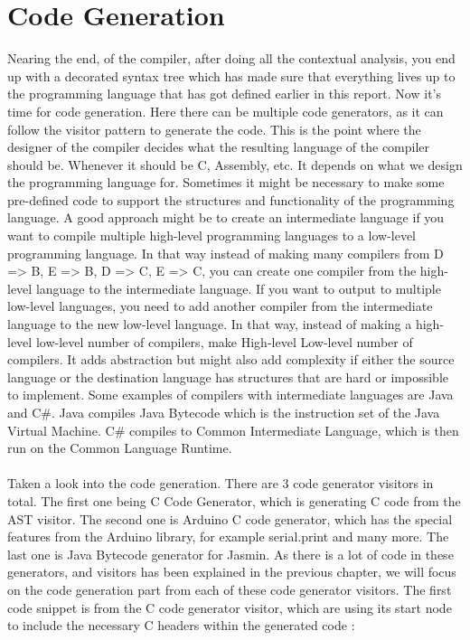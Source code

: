 \section{Code Generation}
Nearing the end, of the compiler, after doing all the contextual analysis, you end up with a decorated syntax tree which has made sure that everything lives up to the programming language that has got defined earlier in this report. Now it’s time for code generation.
Here there can be multiple code generators, as it can follow the visitor pattern to generate the code. This is the point where the designer of the compiler decides what the resulting language of the compiler should be. Whenever it should be C, Assembly, etc. It depends on what we design the programming language for. Sometimes it might be necessary to make some pre-defined code to support the structures and functionality of the programming language.
A good approach might be to create an intermediate language if you want to compile multiple high-level programming languages to a low-level programming language. In that way instead of making many compilers from D => B, E => B, D => C, E => C, you can create one compiler from the high-level language to the intermediate language. If you want to output to multiple low-level languages, you need to add another compiler from the intermediate language to the new low-level language. In that way, instead of making a high-level \* low-level number of compilers, make High-level \+ Low-level number of compilers. It adds abstraction but might also add complexity if either the source language or the destination language has structures that are hard or impossible to implement. Some examples of compilers with intermediate languages are Java and C\#. Java compiles Java Bytecode which is the instruction set of the Java Virtual Machine. C\# compiles to Common Intermediate Language, which is then run on the Common Language Runtime.\\
\\
Taken a look into the code generation. There are 3 code generator visitors in total. The first one being C Code Generator, which is generating C code from the AST visitor. The second one is Arduino C code generator, which has the special features from the Arduino library, for example serial.print and many more. The last one is Java Bytecode generator for Jasmin. As there is a lot of code in these generators, and visitors has been explained in the previous chapter, we will focus on the code generation part from each of these code generator visitors.
The first code snippet is from the C code generator visitor, which are using its start node to include the necessary C headers within the generated code : \\
